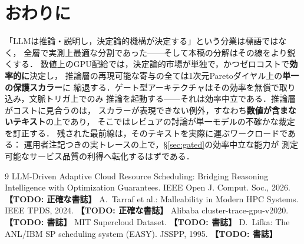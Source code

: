 \documentclass[uplatex,twocolumn,fontsize=9pt,paper=a4]{jlreq}
\newcommand{\todo}[1]{\textbf{【TODO: #1】}}
\begin{document}
\section{おわりに}
「LLMは推論・説明し，決定論的機構が決定する」という分業は標語ではなく，
全層で実測上最適な分割であった——そして本稿の分解はその線をより鋭くする．
数値上のGPU配給では，決定論的市場が単独で，かつゼロコストで\textbf{効率的に}決定し，
推論層の再現可能な寄与の全ては1次元Paretoダイヤル上の\textbf{単一の保護スカラー}に
縮退する．ゲート型アーキテクチャはその効率を無償で取り込み，文脈トリガ上でのみ
推論を起動する——それは効率中立である．推論層がコストに見合うのは，
スカラーが表現できない例外，すなわち\textbf{数値が含まないテキスト}の上であり，
そこではレビュアの討論が単一モデルの不確かな裁定を訂正する．
残された最前線は，そのテキストを実際に運ぶワークロードである：
運用者注記つきの実トレースの上で，\S\ref{sec:gated}の効率中立な能力が
測定可能なサービス品質の利得へ転化するはずである．

\begin{thebibliography}{9}
 LLM-Driven Adaptive Cloud Resource Scheduling: Bridging Reasoning
Intelligence with Optimization Guarantees. IEEE Open J. Comput. Soc., 2026. \todo{正確な書誌}
 A.~Tarraf et al.: Malleability in Modern HPC Systems. IEEE TPDS, 2024. \todo{正確な書誌}
 Alibaba cluster-trace-gpu-v2020. \todo{書誌}
 MIT Supercloud Dataset. \todo{書誌}
 D.~Lifka: The ANL/IBM SP scheduling system (EASY). JSSPP, 1995. \todo{書誌}
\end{thebibliography}
\end{document}
